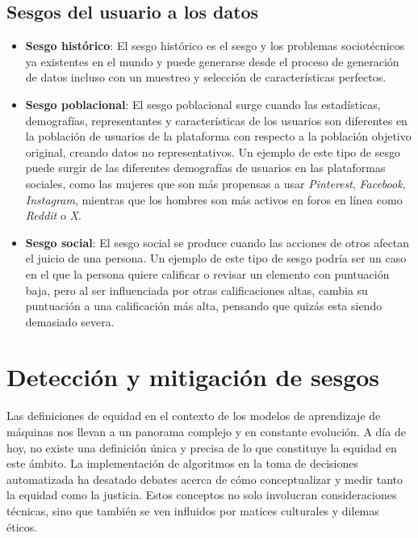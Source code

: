     \subsection{Sesgos del usuario a los datos}

    \begin{itemize}
        \item \textbf{Sesgo hist\'orico}: El sesgo hist\'orico es el sesgo y los problemas sociot\'ecnicos ya existentes en el mundo y puede 
        generarse desde el proceso de generaci\'on de datos incluso con un muestreo y selecci\'on de caracter\'isticas perfectos.

        \item \textbf{Sesgo poblacional}: El sesgo poblacional surge cuando las estad\'isticas, demograf\'ias, representantes y caracter\'isticas 
        de los usuarios son diferentes en la poblaci\'on de usuarios de la plataforma con respecto a la poblaci\'on objetivo original, creando datos no
        representativos. Un ejemplo de este tipo de sesgo puede surgir de las diferentes demograf\'ias de usuarios en las plataformas sociales, como las
        mujeres que son m\'as propensas a usar \textit{Pinterest}, \textit{Facebook}, \textit{Instagram}, mientras que los hombres son m\'as activos en 
        foros en l\'inea como \textit{Reddit} o \textit{X}.

        \item \textbf{Sesgo social}: El sesgo social se produce cuando las acciones de otros afectan el juicio de una persona. Un ejemplo de este tipo de 
        sesgo podr\'ia ser un caso en el que la persona quiere calificar o revisar un elemento con puntuaci\'on baja, pero al ser influenciada por otras
        calificaciones altas, cambia su puntuaci\'on a una calificaci\'on m\'as alta, pensando que quiz\'as esta siendo demasiado severa.
    \end{itemize}

\section{Detecci\'on y mitigaci\'on de sesgos}

Las definiciones de equidad en el contexto de los modelos de aprendizaje de m\'aquinas nos llevan 
a un panorama complejo y en constante evoluci\'on. A d\'ia de hoy, no existe una definici\'on \'unica y precisa
de lo que constituye la equidad en este \'ambito. La implementaci\'on de algoritmos en la toma de decisiones automatizada ha desatado 
debates acerca de c\'omo conceptualizar y medir tanto la equidad como la justicia. Estos conceptos no solo involucran consideraciones 
t\'ecnicas, sino que tambi\'en se ven influidos por matices culturales y dilemas \'eticos.

